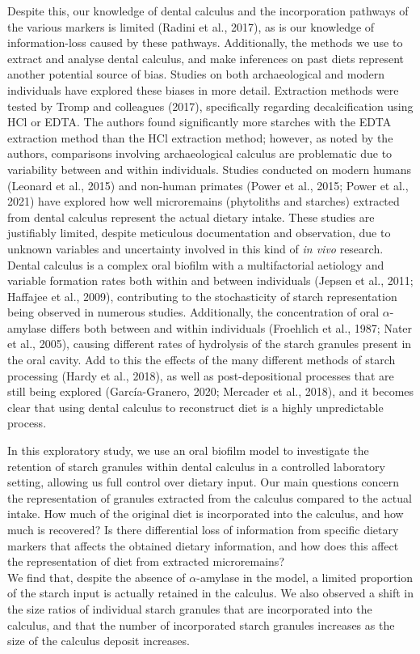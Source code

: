 \documentclass[utf8]{frontiers/frontiersSCNS}
\begin{document}
Despite this, our knowledge of dental calculus and the incorporation pathways of
the various markers is limited (Radini et al., 2017), as is our
knowledge of information-loss caused by these pathways. Additionally, the methods
we use to extract and analyse dental calculus, and make inferences on past diets
represent another potential source of bias. Studies on both archaeological and
modern individuals have explored these biases in more detail.
Extraction methods were tested
by Tromp and colleagues (2017), specifically regarding
decalcification using HCl or EDTA.
The authors found significantly more starches with the EDTA extraction method
than the HCl extraction method; however, as noted by the authors, comparisons
involving archaeological calculus are problematic due to variability between and
within individuals.
Studies conducted on modern humans (Leonard et al., 2015)
and non-human primates (Power et al., 2015; Power et al., 2021)
have explored how well microremains (phytoliths and starches)
extracted from dental calculus represent the actual dietary intake.
These studies are justifiably limited,
despite meticulous documentation and observation, due to unknown variables and
uncertainty involved in this kind of \emph{in vivo} research. Dental calculus is a complex
oral biofilm with a multifactorial aetiology and variable formation rates both
within and between individuals (Jepsen et al., 2011; Haffajee et al., 2009),
contributing to
the stochasticity of starch representation being observed in numerous studies.
Additionally, the concentration of oral \(\alpha\)-amylase differs both between and
within individuals (Froehlich et al., 1987; Nater et al., 2005),
causing different rates of hydrolysis of the starch granules present in the oral
cavity. Add to this the effects of the many different methods
of starch processing (Hardy et al., 2018), as well as post-depositional
processes that are still being explored
(García-Granero, 2020; Mercader et al., 2018),
and it becomes clear that using
dental calculus to reconstruct diet is a highly unpredictable process.

In this exploratory study, we use an oral biofilm model to investigate the
retention of starch granules within dental calculus in a controlled laboratory
setting, allowing us full control over dietary input. Our main questions concern
the representation of granules extracted
from the calculus compared to the actual intake. How much of the original diet is
incorporated into the calculus, and how much is recovered?
Is there differential loss of information from specific dietary markers that affects
the obtained dietary information, and how does this affect the representation of
diet from extracted microremains?\\
We find that, despite the absence of \(\alpha\)-amylase in
the model, a limited proportion of the starch input is actually
retained in the calculus. We also observed a shift in the size ratios of individual
starch granules that are incorporated into the calculus, and that the number of
incorporated starch granules increases as the size of the calculus deposit
increases.
\end{document}
